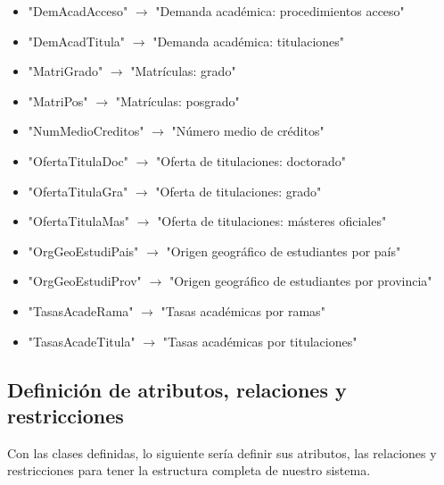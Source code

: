 \begin{itemize}
	\item "DemAcadAcceso" $\rightarrow$ "Demanda académica: procedimientos acceso"
	\item "DemAcadTitula" $\rightarrow$ "Demanda académica: titulaciones"
	\item "MatriGrado" $\rightarrow$ "Matrículas: grado"
	\item "MatriPos" $\rightarrow$ "Matrículas: posgrado"
	\item "NumMedioCreditos" $\rightarrow$ "Número medio de créditos"
	\item "OfertaTitulaDoc" $\rightarrow$ "Oferta de titulaciones: doctorado"
	\item "OfertaTitulaGra" $\rightarrow$ "Oferta de titulaciones: grado"
	\item "OfertaTitulaMas" $\rightarrow$ "Oferta de titulaciones: másteres oficiales"
	\item "OrgGeoEstudiPais" $\rightarrow$ "Origen geográfico de estudiantes por país"
	\item "OrgGeoEstudiProv" $\rightarrow$ "Origen geográfico de estudiantes por provincia"
	\item "TasasAcadeRama" $\rightarrow$ "Tasas académicas por ramas"
	\item "TasasAcadeTitula" $\rightarrow$ "Tasas académicas por titulaciones"
\end{itemize}

\subsection{Definición de atributos, relaciones y restricciones}

Con las clases definidas, lo siguiente sería definir sus atributos, las relaciones y restricciones para tener la estructura completa de nuestro sistema.


